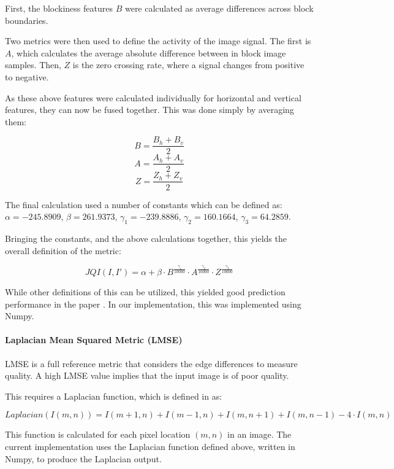 \documentclass[12pt,a4paper]{article}
\begin{document}
                First, the blockiness features $B$ were calculated as average differences across block boundaries. 
                
                Two metrics were then used to define the activity of the image signal. The first is $A$, which calculates the average absolute difference between in block image samples.
                Then, $Z$ is the zero crossing rate, where a signal changes from positive to negative.

                As these above features were calculated individually for horizontal and vertical features, they can now be fused together. This was done simply by averaging them:

                $$B = \frac{B_h + B_v}{2}$$
                $$A = \frac{A_h + A_v}{2}$$
                $$Z = \frac{Z_h + Z_v}{2}$$

                The final calculation used a number of constants which can be defined as:
                $\alpha = -245.8909$, $\beta = 261.9373$, $\gamma_1 = -239.8886$, $\gamma_2 = 160.1664$, $\gamma_3 = 64.2859$.

                Bringing the constants, and the above calculations together, this yields the overall definition of the metric:

                $$JQI(I, I') = \alpha + \beta \cdot B ^{\frac{\gamma_1}{10000}} \cdot A^{\frac{\gamma_2}{10000}} \cdot Z^{\frac{\gamma_3}{10000}}$$

                While other definitions of this can be utilized, this yielded good prediction performance in the paper \cite{JQIPaper}. In our implementation, this was implemented using 
                Numpy.
            \paragraph{Laplacian Mean Squared Metric (LMSE)}
                LMSE is a full reference metric that considers the edge differences to measure quality. A high LMSE value implies that the input image is of poor quality. 
                    
                This requires a Laplacian function, which is defined in \cite{LMSEPaper} as:

                $$Laplacian(I(m, n)) = I(m+1, n) + I(m-1, n) + I(m, n+1) + I(m, n-1) - 4\cdot I(m, n)$$

                This function is calculated for each pixel location $(m, n)$ in an image. The current implementation uses the Laplacian function defined above, written in Numpy, to produce the Laplacian output. 
                \cite{LMSEPaper}
\end{document}
